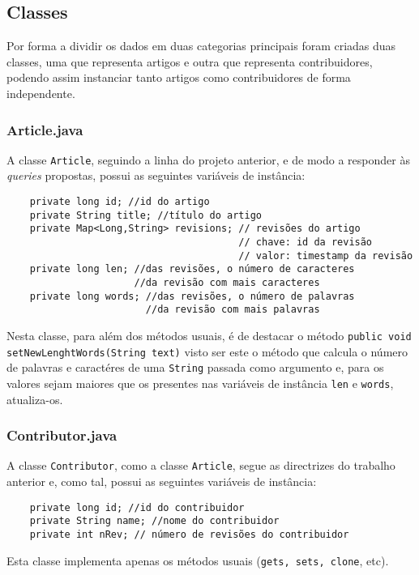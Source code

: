 \documentclass[a4paper,11pt]{article}
\begin{document}
\subsection{Classes}
Por forma a dividir os dados em duas categorias principais foram criadas duas classes, uma que representa artigos e outra que representa contribuidores, podendo assim instanciar tanto artigos como contribuidores de forma independente.

\subsubsection{Article.java}
A classe \texttt{Article}, seguindo a linha do projeto anterior, e de modo a responder às \textit{queries} propostas, possui as seguintes variáveis de instância:
\begin{verbatim}
    private long id; //id do artigo
    private String title; //título do artigo
    private Map<Long,String> revisions; // revisões do artigo
                                        // chave: id da revisão
                                        // valor: timestamp da revisão
    private long len; //das revisões, o número de caracteres 
                      //da revisão com mais caracteres 
    private long words; //das revisões, o número de palavras 
                        //da revisão com mais palavras
\end{verbatim}
Nesta classe, para além dos métodos usuais, é de destacar o método \texttt{public void setNewLenghtWords(String text)} visto ser este o  método que calcula o número de palavras e caractéres de uma \texttt{String} passada como argumento e, para os valores sejam maiores que os presentes nas variáveis de instância \texttt{len} e \texttt{words}, atualiza-os.

\subsubsection{Contributor.java}
A classe \texttt{Contributor}, como a classe \texttt{Article}, segue as directrizes do trabalho anterior e, como tal, possui as seguintes variáveis de instância:
\begin{verbatim}
    private long id; //id do contribuidor
    private String name; //nome do contribuidor
    private int nRev; // número de revisões do contribuidor
\end{verbatim}
Esta classe implementa apenas os métodos usuais (\texttt{gets, sets, clone}, etc).
\end{document}
